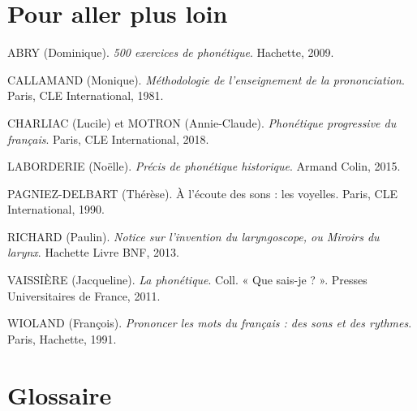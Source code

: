 \section*{Pour aller plus loin}
\begin{small}
\setlength{\parindent}{0pt}\setlength{\parskip}{.55em}
ABRY (Dominique). \textit{500 exercices de phonétique}. Hachette, 2009.

CALLAMAND (Monique). \textit{Méthodologie de l’enseignement de la prononciation}. Paris, CLE International, 1981.

CHARLIAC (Lucile) et MOTRON (Annie-Claude). \textit{Phonétique progressive du français}. Paris, CLE International, 2018.

LABORDERIE (Noëlle). \textit{Précis de phonétique historique}. Armand Colin, 2015.

PAGNIEZ-DELBART (Thérèse). À l’écoute des sons : les voyelles. Paris, CLE International, 1990.

RICHARD (Paulin). \textit{Notice sur l’invention du laryngoscope, ou Miroirs du larynx}. Hachette Livre BNF, 2013.

VAISSIÈRE (Jacqueline). \textit{La phonétique}. Coll. « Que sais-je ? ». Presses Universitaires de France, 2011.

WIOLAND (François). \textit{Prononcer les mots du français : des sons et des rythmes}. Paris, Hachette, 1991.
\end{small}
\section*{Glossaire}

